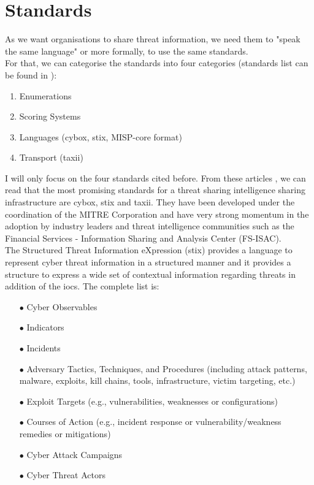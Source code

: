 \documentclass{eplmastersthesis}
\begin{document}
\section{Standards}
As we want organisations to share threat information, we need them to "speak the same language" or more formally, to use the same standards.\\
For that, we can categorise the standards into four categories (standards list can be found in \cite{AwesomeTreat, mohaisen2017rethinking}):
\begin{enumerate}
\item Enumerations
\item Scoring Systems
\item Languages (\gls{cybox}, \gls{stix}, MISP-core format)
\item Transport (\gls{taxii})
\end{enumerate}

I will only focus on the four standards cited before. From these articles \cite{fransen2015cyber, sauerwein2017threat}, we can read that the most promising standards for a threat sharing intelligence sharing infrastructure are \gls{cybox}, \gls{stix} and \gls{taxii}. They have been developed under the coordination of the MITRE Corporation and have very strong momentum in the adoption by industry leaders and threat intelligence communities such as the Financial Services - Information Sharing and Analysis Center (FS-ISAC).\\
The Structured Threat Information eXpression (\gls{stix}) \cite{barnum2012standardizing} provides a language to represent cyber threat information in a structured manner and it provides a structure to express a wide set of contextual information regarding threats in addition of the \gls{ioc}s. The complete list is:

\begin{itemize}
\item[$\bullet$] Cyber Observables
\item[$\bullet$] Indicators
\item[$\bullet$] Incidents
\item[$\bullet$] Adversary Tactics, Techniques, and Procedures (including attack patterns, malware, exploits, kill
chains, tools, infrastructure, victim targeting, etc.)
\item[$\bullet$] Exploit Targets (e.g., vulnerabilities, weaknesses or configurations)
\item[$\bullet$] Courses of Action (e.g., incident response or vulnerability/weakness remedies or mitigations)
\item[$\bullet$] Cyber Attack Campaigns
\item[$\bullet$] Cyber Threat Actors
\end{itemize}
\end{document}
